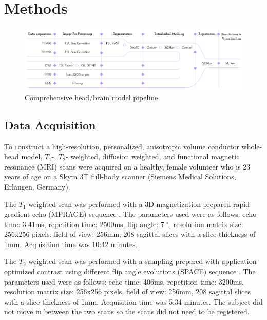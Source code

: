 
\section{Methods}
\label{sec:Methods}

\begin{figure}[H]
    \centering
    \includegraphics[width=\textwidth]{Figures/pipeline}
    \caption{Comprehensive head/brain model pipeline}
    \label{fig:pipeline}
\end{figure}

\subsection{Data Acquisition}
\label{sec:Data}


To construct a high-resolution, personalized, anisotropic volume conductor whole-head model, $T_1$-, $T_2$- weighted, diffusion weighted, and functional magnetic resonance (MRI) scans were acquired on a healthy, female volunteer who is 23 years of age on a Skyra 3T full-body scanner (Siemens Medical Solutions, Erlangen, Germany). 

The $T_1$-weighted scan was performed with a 3D magnetization prepared rapid gradient echo (MPRAGE) sequence \cite{ref:mprage}. The parameters used were as follows: echo time: 3.41ms, repetition time: 2500ms, flip angle: 7 $^{\circ}$, resolution matrix size: 256x256 pixels, field of view: 256mm, 208 sagittal slices with a slice thickness of 1mm. Acquisition time was 10:42 minutes. 

The $T_2$-weighted scan was performed with a sampling prepared with application-optimized contrast using different flip angle evolutions (SPACE) sequence \cite{ref:space}. The parameters used were as follows: echo time: 406ms, repetition time: 3200ms, resolution matrix size: 256x256 pixels, field of view: 256mm, 208 sagittal slices with a slice thickness of 1mm. Acquisition time was 5:34 minutes. The subject did not move in between the two scans so the scans did not need to be registered. 

